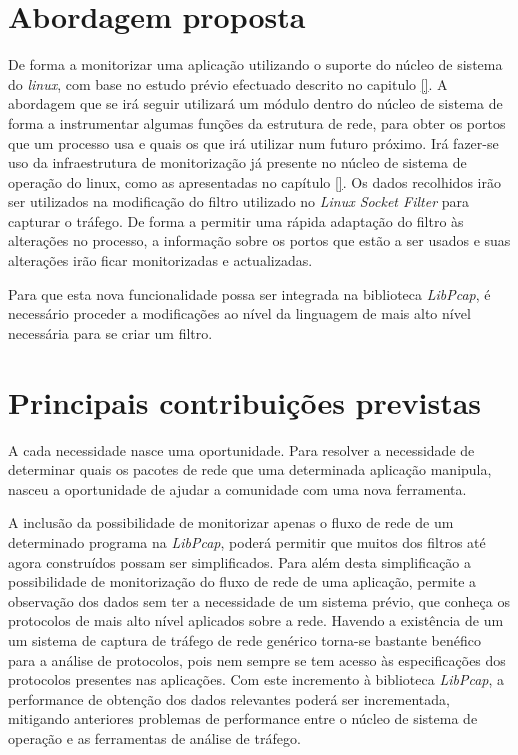 \section{Abordagem proposta}\label{sec:abordagem_proposta}
De forma a monitorizar uma aplicação utilizando o suporte do núcleo de sistema do \textit{linux}, com base no estudo prévio efectuado descrito no capitulo \ref{}.
A abordagem que se irá seguir utilizará um módulo dentro do núcleo de sistema de forma a instrumentar algumas funções da estrutura de rede, para obter os portos que um processo usa e quais os que irá utilizar num futuro próximo.
Irá fazer-se uso da infraestrutura de monitorização já presente no núcleo de sistema de operação do linux, como as apresentadas no capítulo \ref{}.
Os dados recolhidos irão ser utilizados na modificação do filtro utilizado no \textit{Linux Socket Filter} para capturar o tráfego.
De forma a permitir uma rápida adaptação do filtro às alterações no processo, a informação sobre os portos que estão a ser usados e suas alterações irão ficar monitorizadas e actualizadas.

Para que esta nova funcionalidade possa ser integrada na biblioteca \textit{LibPcap}, é necessário proceder a modificações ao nível da linguagem de mais alto nível necessária para se criar um filtro.

\section{Principais contribuições previstas} \label{sect:contribuicoes}


A cada necessidade nasce uma oportunidade.
Para resolver a necessidade de determinar quais os pacotes de rede que uma determinada aplicação manipula, nasceu a oportunidade de ajudar a comunidade com uma nova ferramenta.

A inclusão da possibilidade de monitorizar apenas o fluxo de rede de um determinado programa na \textit{LibPcap}, poderá permitir que muitos dos filtros até agora construídos possam ser simplificados.
Para além desta simplificação a possibilidade de monitorização do fluxo de rede de uma aplicação, permite a observação dos dados sem ter a necessidade de um sistema prévio, que conheça os protocolos de mais alto nível aplicados sobre a rede.
Havendo a existência de um um sistema de captura de tráfego de rede genérico torna-se bastante benéfico para a análise de protocolos, pois nem sempre se tem acesso às especificações dos protocolos presentes nas aplicações.
Com este incremento à biblioteca \textit{LibPcap}, a performance de obtenção dos dados relevantes poderá ser incrementada, mitigando anteriores problemas de performance entre o núcleo de sistema de operação e as ferramentas de análise de tráfego.

